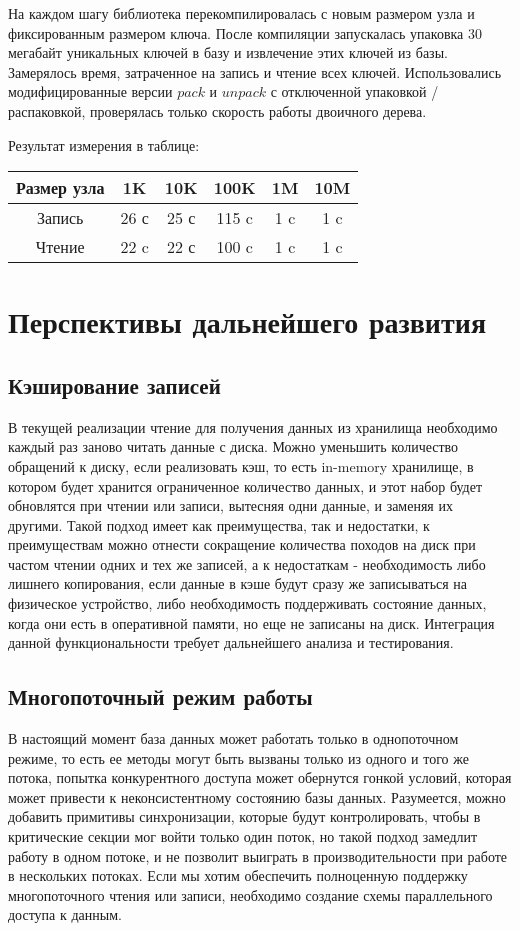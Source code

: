\documentclass[14pt, russian]{scrartcl}
\begin{document}
На каждом шагу библиотека перекомпилировалась с новым размером узла и фиксированным размером ключа. После компиляции запускалась упаковка 30 мегабайт уникальных ключей в базу и извлечение этих ключей из базы. Замерялось время, затраченное на запись и чтение всех ключей. Использовались модифицированные версии $pack$ и $unpack$ с отключенной упаковкой / распаковкой, проверялась только скорость работы двоичного дерева.

Результат измерения в таблице:

\begin{table}[htbp]
  \begin{tabular}{|c|c|c|c|c|c|}
    \hline
     Размер узла & 1K & 10K & 100K & 1M & 10M \\
    \hline
     Запись & 26 с & 25 с & 115 c & 1 c & 1 c \\
    \hline
    Чтение & 22 c & 22 с & 100 c & 1 c & 1 c  \\
    \hline
  \end{tabular}
\end{table}


\section{Перспективы дальнейшего развития}
\subsection{Кэширование записей}
В текущей реализации чтение для получения данных из хранилища необходимо каждый раз заново читать данные с диска. Можно уменьшить количество обращений к диску, если реализовать кэш, то есть in-memory хранилище, в котором будет хранится ограниченное количество данных, и этот набор будет обновлятся при чтении или записи, вытесняя одни данные, и заменяя их другими. Такой подход имеет как преимущества, так и недостатки, к преимуществам можно отнести сокращение количества походов на диск при частом чтении одних и тех же записей, а к недостаткам - необходимость либо лишнего копирования, если данные в кэше будут сразу же записываться на физическое устройство, либо необходимость поддерживать состояние данных, когда они есть в оперативной памяти, но еще не записаны на диск. Интеграция данной функциональности требует дальнейшего анализа и тестирования.

\subsection{Многопоточный режим работы}
В настоящий момент база данных может работать только в однопоточном режиме, то есть ее методы могут быть вызваны только из одного и того же потока, попытка конкурентного доступа может обернутся гонкой условий, которая может привести к неконсистентному состоянию базы данных. Разумеется, можно добавить примитивы синхронизации, которые будут контролировать, чтобы в критические секции мог войти только один поток, но такой подход замедлит работу в одном потоке, и не позволит выиграть в производительности при работе в нескольких потоках. Если мы хотим обеспечить полноценную поддержку многопоточного чтения или записи, необходимо создание схемы параллельного доступа к данным.
\end{document}
